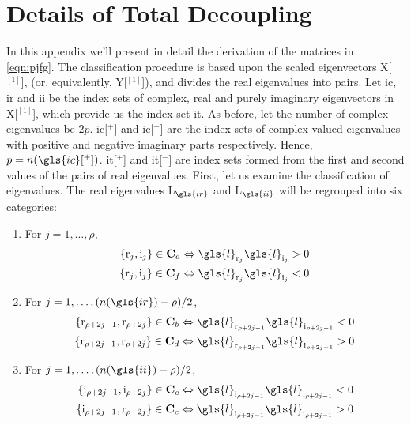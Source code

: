 \chapter{Details of Total Decoupling}
\label{app:A}
In this appendix we'll present in detail the derivation of the matrices in
\eqref{eqn:pjfg}. The classification procedure \citep[sec~3.1]{Chu200896} is based upon the 
scaled eigenvectors \gls{X}[$^{[1]}$], (or, equivalently, \gls{Y}[$^{[1]}$]),
and divides the real eigenvalues into pairs. Let \gls{ic}, \gls{ir} and 
\gls{ii} be the index sets of complex, real and purely imaginary eigenvectors 
in \gls{X}[$^{[1]}$], which provide us the index set \gls{it}. As before, 
let the number of complex eigenvalues be $2p$. \gls{ic}[$^+$] and \gls{ic}[$^-$]
are the index sets of complex-valued eigenvalues with positive and negative 
imaginary parts respectively. Hence, $p = n(\gls{ic}[^+])$. \gls{it}[$^+$] 
and \gls{it}[$^-$] are index sets formed from the first and second values of
the pairs of real eigenvalues. First, let us examine the classification of eigenvalues.
The real eigenvalues \gls{L}$_{\gls{ir}}$ and \gls{L}$_{\gls{ii}}$ will be
regrouped into six categories:
\begin{enumerate}
\label{list:class}
\item For $j = 1, \dots, \rho$,
\begin{align}
\left\lbrace \mathrm{r}_j, \mathrm{i}_j\right\rbrace \in \mathbf{C}_a 
&\Leftrightarrow \gls{l}_{\mathrm{r}_j}\gls{l}_{\mathrm{i}_j} > 0\\
\left\lbrace \mathrm{r}_j, \mathrm{i}_j\right\rbrace \in \mathbf{C}_f 
&\Leftrightarrow \gls{l}_{\mathrm{r}_j}\gls{l}_{\mathrm{i}_j} < 0
\end{align}
\item For $j = 1, \dots, (n(\gls{ir}) - \rho)/2$,
\begin{align}
\left\lbrace \mathrm{r}_{\rho+2j-1}, \mathrm{r}_{\rho+2j}\right\rbrace \in \mathbf{C}_b
&\Leftrightarrow \gls{l}_{\mathrm{r}_{\rho+2j-1}}\gls{l}_{\mathrm{i}_{\rho+2j-1}} < 0\\
\left\lbrace \mathrm{r}_{\rho+2j-1}, \mathrm{r}_{\rho+2j}\right\rbrace \in \mathbf{C}_d
&\Leftrightarrow \gls{l}_{\mathrm{r}_{\rho+2j-1}}\gls{l}_{\mathrm{i}_{\rho+2j-1}} > 0
\end{align}
\item For $j = 1, \dots, (n(\gls{ii}) - \rho)/2$,
\begin{align}
\left\lbrace \mathrm{i}_{\rho+2j-1}, \mathrm{i}_{\rho+2j}\right\rbrace \in \mathbf{C}_c
&\Leftrightarrow \gls{l}_{\mathrm{i}_{\rho+2j-1}}\gls{l}_{\mathrm{i}_{\rho+2j-1}} < 0\\
\left\lbrace \mathrm{i}_{\rho+2j-1}, \mathrm{r}_{\rho+2j}\right\rbrace \in \mathbf{C}_e
&\Leftrightarrow \gls{l}_{\mathrm{i}_{\rho+2j-1}}\gls{l}_{\mathrm{i}_{\rho+2j-1}} > 0
\end{align}
\end{enumerate}
